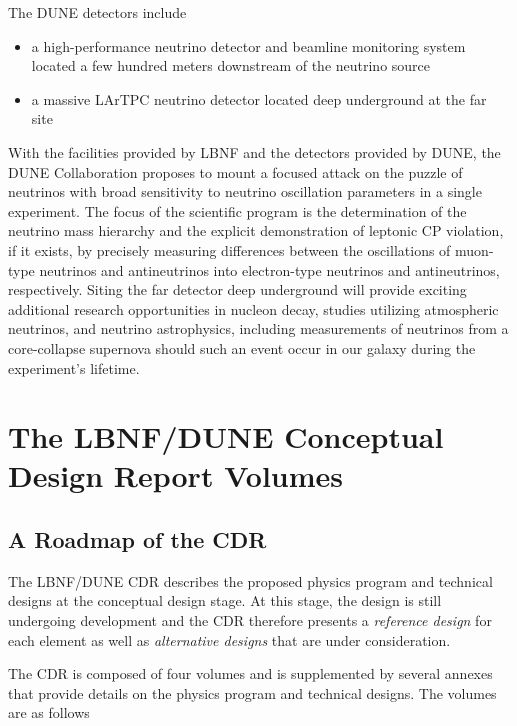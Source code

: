 The DUNE detectors include
\begin{itemize}
\item a high-performance neutrino detector and beamline monitoring system
located a few hundred meters downstream of the neutrino source
\item a massive LArTPC neutrino detector located deep underground at the far site
\end{itemize}

With the facilities provided by LBNF and the detectors provided by
DUNE, the DUNE Collaboration proposes to mount a focused attack on the
puzzle of neutrinos with broad sensitivity to neutrino oscillation
parameters in a single experiment.  The focus of the scientific
program is the determination of the neutrino mass hierarchy and the
explicit demonstration of leptonic CP violation, if it exists, by
precisely measuring differences between the oscillations of muon-type
neutrinos and antineutrinos into electron-type neutrinos
and antineutrinos, respectively. Siting the far detector deep underground will
provide exciting additional research opportunities in nucleon decay,
studies utilizing atmospheric neutrinos, and neutrino astrophysics,
including measurements of neutrinos from a core-collapse supernova
should such an event occur in our galaxy during the experiment's
lifetime.

\section{The LBNF/DUNE Conceptual Design Report Volumes}

\subsection{A Roadmap of the CDR}

The LBNF/DUNE CDR describes the proposed physics program and 
technical designs at the conceptual design stage.  At this stage, the design is
still undergoing development and the CDR therefore presents a \textit{reference design} 
for each element as well as \textit{alternative designs} that are under consideration.

The CDR is composed of four volumes and is supplemented by several annexes that 
provide details on the physics program and technical designs. The volumes are as follows

